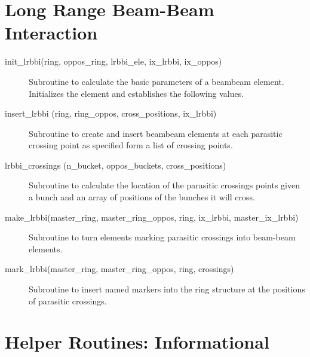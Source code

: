 \section{Long Range Beam-Beam Interaction}
\label{r:lrbbi}    

\begin{description}

\item[init\_lrbbi(ring, oppos\_ring, lrbbi\_ele, ix\_lrbbi, ix\_oppos)] \Newline 
     Subroutine to calculate the basic parameters of a beambeam element. 
     Initializes the element and establishes the following values.

\item[insert\_lrbbi (ring, ring\_oppos, cross\_positions, ix\_lrbbi)] \Newline
Subroutine to create and insert beambeam elements at each parasitic crossing
point as specified form a list of crossing points.

\item[lrbbi\_crossings (n\_bucket, oppos\_buckets, cross\_positions)] \Newline
Subroutine to calculate the location of the parasitic crossings points 
given a bunch and an array of positions of the bunches it will cross. 

\item[make\_lrbbi(master\_ring, master\_ring\_oppos, ring, ix\_lrbbi, master\_ix\_lrbbi)] \Newline
Subroutine to turn elements marking parasitic crossings into beam-beam elements. 

\item[mark\_lrbbi(master\_ring, master\_ring\_oppos, ring, crossings)] \Newline
Subroutine to insert named markers into the ring structure at the positions of parasitic crossings. 

\end{description}

\section{Helper Routines: Informational}
\label{r:info}     

